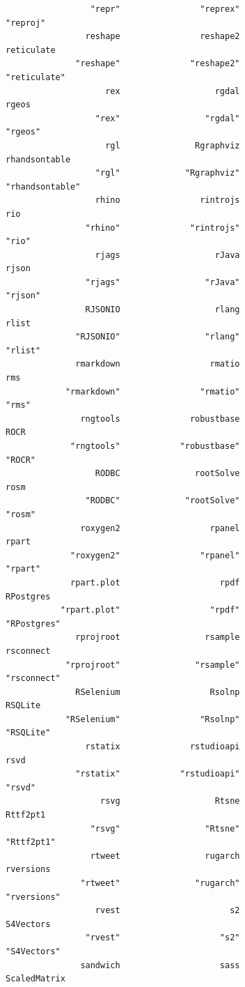\documentclass[
  letterpaper,
  DIV=11,
  numbers=noendperiod]{scrreprt}
\begin{document}
\begin{verbatim}
                 "repr"                "reprex"                "reproj" 
                reshape                reshape2              reticulate 
              "reshape"              "reshape2"            "reticulate" 
                    rex                   rgdal                   rgeos 
                  "rex"                 "rgdal"                 "rgeos" 
                    rgl               Rgraphviz           rhandsontable 
                  "rgl"             "Rgraphviz"         "rhandsontable" 
                  rhino                rintrojs                     rio 
                "rhino"              "rintrojs"                   "rio" 
                  rjags                   rJava                   rjson 
                "rjags"                 "rJava"                 "rjson" 
                RJSONIO                   rlang                   rlist 
              "RJSONIO"                 "rlang"                 "rlist" 
              rmarkdown                  rmatio                     rms 
            "rmarkdown"                "rmatio"                   "rms" 
               rngtools              robustbase                    ROCR 
             "rngtools"            "robustbase"                  "ROCR" 
                  RODBC               rootSolve                    rosm 
                "RODBC"             "rootSolve"                  "rosm" 
               roxygen2                  rpanel                   rpart 
             "roxygen2"                "rpanel"                 "rpart" 
             rpart.plot                    rpdf               RPostgres 
           "rpart.plot"                  "rpdf"             "RPostgres" 
              rprojroot                 rsample               rsconnect 
            "rprojroot"               "rsample"             "rsconnect" 
              RSelenium                  Rsolnp                 RSQLite 
            "RSelenium"                "Rsolnp"               "RSQLite" 
                rstatix              rstudioapi                    rsvd 
              "rstatix"            "rstudioapi"                  "rsvd" 
                   rsvg                   Rtsne                Rttf2pt1 
                 "rsvg"                 "Rtsne"              "Rttf2pt1" 
                 rtweet                 rugarch               rversions 
               "rtweet"               "rugarch"             "rversions" 
                  rvest                      s2               S4Vectors 
                "rvest"                    "s2"             "S4Vectors" 
               sandwich                    sass            ScaledMatrix 

\end{verbatim}
\end{document}
